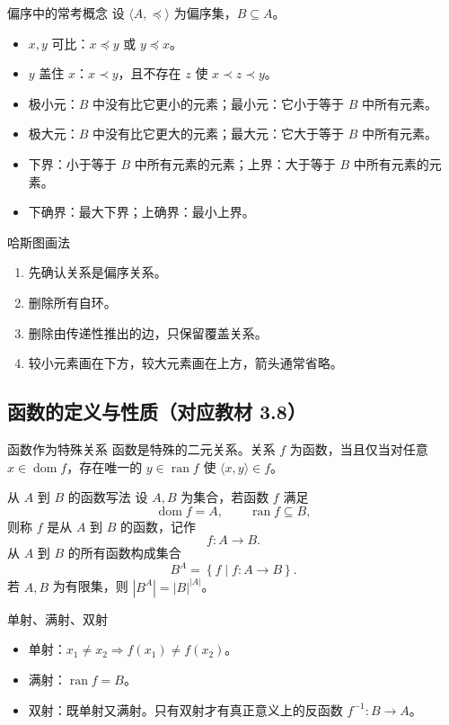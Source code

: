 \documentclass[UTF8,zihao=-4]{ctexart}
\newcommand{\set}[1]{\left\{#1\right\}}
\newcommand{\dom}{\operatorname{dom}}
\newcommand{\ran}{\operatorname{ran}}
\begin{document}
\begin{corebox}{偏序中的常考概念}
设 $\langle A,\preceq\rangle$ 为偏序集，$B\subseteq A$。
\begin{itemize}
  \item $x,y$ 可比：$x\preceq y$ 或 $y\preceq x$。
  \item $y$ 盖住 $x$：$x\prec y$，且不存在 $z$ 使 $x\prec z\prec y$。
  \item 极小元：$B$ 中没有比它更小的元素；最小元：它小于等于 $B$ 中所有元素。
  \item 极大元：$B$ 中没有比它更大的元素；最大元：它大于等于 $B$ 中所有元素。
  \item 下界：小于等于 $B$ 中所有元素的元素；上界：大于等于 $B$ 中所有元素的元素。
  \item 下确界：最大下界；上确界：最小上界。
\end{itemize}
\end{corebox}

\begin{methodbox}{哈斯图画法}
\begin{enumerate}
  \item 先确认关系是偏序关系。
  \item 删除所有自环。
  \item 删除由传递性推出的边，只保留覆盖关系。
  \item 较小元素画在下方，较大元素画在上方，箭头通常省略。
\end{enumerate}
\end{methodbox}

\subsection{函数的定义与性质（对应教材 3.8）}

\begin{corebox}{函数作为特殊关系}
函数是特殊的二元关系。关系 $f$ 为函数，当且仅当对任意 $x\in\dom f$，存在唯一的 $y\in\ran f$ 使 $\langle x,y\rangle\in f$。
\end{corebox}

\begin{corebox}{从 $A$ 到 $B$ 的函数写法}
设 $A,B$ 为集合，若函数 $f$ 满足
\[
\dom f=A,
\qquad
\ran f\subseteq B,
\]
则称 $f$ 是从 $A$ 到 $B$ 的函数，记作
\[
f:A\to B.
\]
从 $A$ 到 $B$ 的所有函数构成集合
\[
B^A=\set{f\mid f:A\to B}.
\]
若 $A,B$ 为有限集，则 $|B^A|=|B|^{|A|}$。
\end{corebox}

\begin{corebox}{单射、满射、双射}
\begin{itemize}
  \item 单射：$x_1\neq x_2\Rightarrow f(x_1)\neq f(x_2)$。
  \item 满射：$\ran f=B$。
  \item 双射：既单射又满射。只有双射才有真正意义上的反函数 $f^{-1}:B\to A$。
\end{itemize}
\end{corebox}
\end{document}
